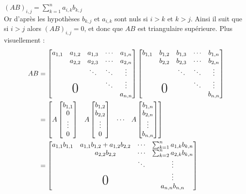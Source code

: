 \begin{exercice}
\, \\
\noindent $(AB)_{i,j}=\displaystyle\sum_{k=1}^{n}a_{i,k}b_{k,j}$ \\
Or d'après les hypothèses $b_{k,j}$ et $a_{i,k}$ sont nuls si $i>k$ et $k>j$. Ainsi il suit que si $i>j$ alors $(AB)_{i,j}=0$, et donc que $AB$ est triangulaire supérieure. Plus visuellement :
\begin{align*}
AB &= \begin{bmatrix}
a_{1,1} & a_{1,2} & a_{1,3} & \cdots & a_{1,n} \\
  & a_{2,2} & a_{2,3} & \cdots & a_{2,n} \\
  &   & \ddots & \ddots & \vdots \\
  & \bigzero  &  & \ddots & \vdots \\
  &   &   &  & a_{n,n}
\end{bmatrix}
 \begin{bmatrix}
b_{1,1} & b_{1,2} & b_{1,3} & \cdots & b_{1,n} \\
  & b_{2,2} & b_{2,3} & \cdots & b_{2,n} \\
  &   & \ddots & \ddots & \vdots \\
  & \bigzero  &  & \ddots & \vdots \\
  &   &   &  & b_{n,n}
\end{bmatrix}\\
&= \begin{bmatrix}
A\begin{bmatrix}
b_{1,1} \\ 0 \\ \vdots \\ 0
\end{bmatrix} & 
A\begin{bmatrix}
b_{1,2} \\ b_{2,2} \\ \vdots \\ 0
\end{bmatrix} &
\cdots &
A \begin{bmatrix}
b_{1,n} \\ b_{2,n} \\ \vdots\\ b_{n,n}
\end{bmatrix}
\end{bmatrix}\\
&= \begin{bmatrix}
a_{1,1}b_{1,1} &a_{1,1} b_{1,2} + a_{1,2}b_{2,2}  & \cdots & \sum_{k = 1}^n a_{1, k}b_{k, n} \\
  & a_{2,2}b_{2,2}  & \cdots & \sum_{k = 2}^n a_{2,k}b_{k,n} \\
  &   & \ddots & \vdots \\
  & \bigzero  & & \vdots \\
  &   &   &   a_{n,n}b_{n,n}
\end{bmatrix}
\end{align*}
\, \\
\end{exercice}

